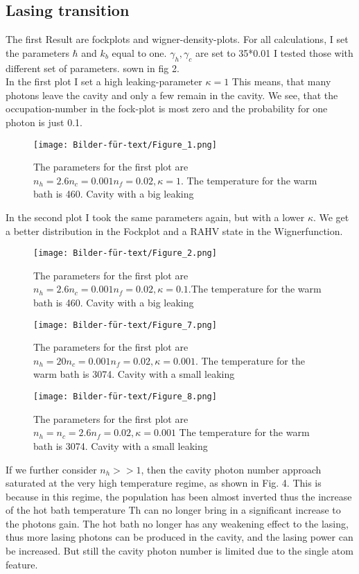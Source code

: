 \documentclass[12pt,a4paper]{article}
\begin{document}
\subsection{Lasing transition}
The first Result are fockplots and wigner-density-plots.
For all calculations, I set the parameters  $\hbar$ and $k_b$ equal to one. $\gamma_h, \gamma_c $ are set to 35*0.01
I tested those with different set of parameters. 
sown in fig 2.\\

In the first plot I set a high leaking-parameter $\kappa=1$ 
This means, that many photons leave the cavity and only a few remain in the cavity. 
We see, that the occupation-number in the fock-plot is most zero and the probability for one photon is just 0.1.

\begin{figure}[h!]
\centering
\texttt{[image: Bilder-für-text/Figure\_1.png]}
\caption{The parameters for the first plot are$ n_h=2.6 n_c=0.001 n_f=0.02,\kappa=1$. The temperature for the warm bath is 460. Cavity with a big leaking}
\end{figure}\newpage

In the second plot I took the same parameters again, but with a lower $\kappa$. We get a better distribution in the Fockplot and a RAHV state in the Wignerfunction. 

\begin{figure}[h!]
\centering
\texttt{[image: Bilder-für-text/Figure\_2.png]}
\caption{The parameters for the first plot are $n_h=2.6 n_c=0.001 n_f=0.02,\kappa=0.1$.The temperature for the warm bath is 460. Cavity with a big leaking}
\end{figure}

\begin{figure}[h!]
\centering
\texttt{[image: Bilder-für-text/Figure\_7.png]}
\caption{The parameters for the first plot are$ n_h=20 n_c=0.001 n_f=0.02,\kappa=0.001$. The temperature for the warm bath is 3074. Cavity with a small leaking}
\end{figure}


\begin{figure}[h!]
\centering
\texttt{[image: Bilder-für-text/Figure\_8.png]}
\caption{The parameters for the first plot are $n_h=n_c=2.6 n_f=0.02,\kappa=0.001$ The temperature for the warm bath is 3074. Cavity with a small leaking}
\end{figure}

If we further consider  $n_h >>1$,
then the cavity photon number approach saturated at the very
high temperature regime, as shown in Fig. 4. This is because
in this regime, the population has been almost inverted
 thus the increase of the hot bath temperature Th
can no longer bring in a significant increase to the photons gain.
The hot bath no longer has
any weakening effect to the lasing, thus more lasing photons
can be produced in the cavity, and the lasing power can be
increased. But still the cavity photon number is limited due to
the single atom feature.%
\end{document}
